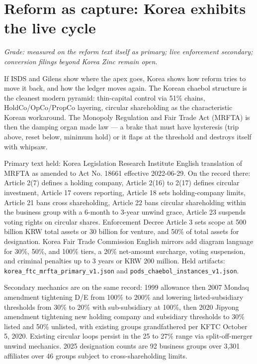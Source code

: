 \section{Reform as capture: Korea exhibits the live cycle}

\textit{Grade: measured on the reform text itself as primary; live enforcement secondary; conversion filings beyond Korea Zinc remain open.}

If ISDS and Gilens show where the apex goes, Korea shows how reform tries to move it back, and how the ledger moves again. The Korean chaebol structure is the cleanest modern pyramid: thin-capital control via 51\% chains, HoldCo/OpCo/PropCo layering, circular shareholding as the characteristic Korean workaround. The Monopoly Regulation and Fair Trade Act (MRFTA) is then the damping organ made law --- a brake that must have hysteresis (trip above, reset below, minimum hold) or it flaps at the threshold and destroys itself with whipsaw.

Primary text held: Korea Legislation Research Institute English translation of MRFTA as amended to Act No. 18661 effective 2022-06-29. On the record there: Article 2(7) defines a holding company, Article 2(16) to 2(17) defines circular investment, Article 17 covers reporting, Article 18 sets holding-company limits, Article 21 bans cross shareholding, Article 22 bans circular shareholding within the business group with a 6-month to 3-year unwind grace, Article 23 suspends voting rights on circular shares. Enforcement Decree Article 3 sets scope at 500 billion KRW total assets or 30 billion for venture, and 50\% of total assets for designation. Korea Fair Trade Commission English mirrors add diagram language for 30\%, 50\%, and 100\% tiers, a 20\% net-amount surcharge, voting suspension, and criminal penalties up to 3 years or KRW 200 million. Held artifacts: \texttt{korea\_ftc\_mrfta\_primary\_v1.json} and \texttt{pods\_chaebol\_instances\_v1.json}.

Secondary mechanics are on the same record: 1999 allowance then 2007 Mondaq amendment tightening D/E from 100\% to 200\% and lowering listed-subsidiary thresholds from 30\% to 20\% with sub-subsidiary at 100\%, then 2020 Jipyong amendment tightening new holding company and subsidiary thresholds to 30\% listed and 50\% unlisted, with existing groups grandfathered per KFTC October 5, 2020. Existing circular loops persist in the 25 to 27\% range via split-off-merger unwind mechanics. 2025 designation counts are 92 business groups over 3,301 affiliates over 46 groups subject to cross-shareholding limits.

